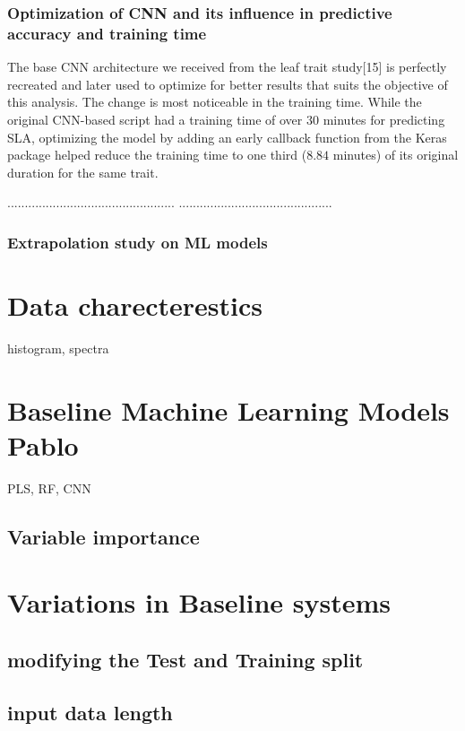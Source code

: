 \documentclass[12pt,a4paper]{report}
\begin{document}
\subsubsection*{Optimization of CNN and its influence in predictive accuracy and training time}
The base CNN architecture we received from the leaf trait study[15] is perfectly recreated and later used to optimize for better results that suits the objective of this analysis. The change is most noticeable in the training time. While the original CNN-based script had a training time of over $30$ minutes for predicting SLA, optimizing the model by adding an early callback function from the Keras package helped reduce the training time to one third ($8.84$ minutes) of its original duration for the same trait. 

................................................
............................................

\subsubsection*{Extrapolation study on ML models}






\section{Data charecterestics}
histogram, spectra
\section{Baseline Machine Learning Models Pablo}
PLS, RF, CNN

\subsection{Variable importance}

\section{ Variations in Baseline systems}
\subsection{ modifying the Test and Training split}
\subsection{ input data length}
\end{document}
